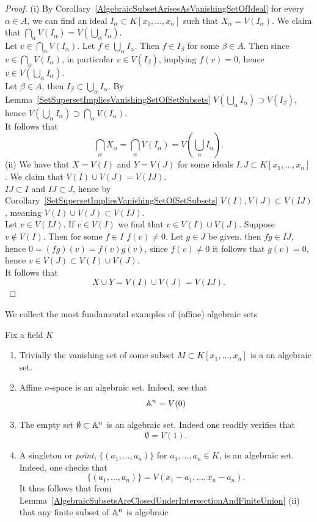 \begin{proof}
    (i) By Corollary~\ref{AlgebraicSubsetArisesAsVanishingSetOfIdeal} for every $\alpha\in A$, we can find an ideal $I_\alpha \subset K[x_1,\dots,x_n]$ such that $X_\alpha = V(I_\alpha)$. We claim that $\bigcap_\alpha V(I_\alpha) = V\left( \bigcup_\alpha I_\alpha\right)$.\\
    Let $v \in \bigcap_\alpha V(I_\alpha)$. Let $f\in \bigcup_\alpha I_\alpha$. Then $f\in I_\beta$ for some $\beta\in A$. Then since $v \in \bigcap_\alpha V(I_\alpha)$, in particular $v\in V(I_\beta)$, implying $f(v) = 0$, hence $v\in V\left( \bigcup_\alpha I_\alpha\right)$.\\
    Let $\beta\in A$, then $I_\beta \subset \bigcup_\alpha I_\alpha$. By Lemma~\ref{SetSupersetImpliesVanishingSetOfSetSubsets} $V\left(\bigcup_\alpha I_\alpha\right) \supset V(I_\beta)$, hence $V\left(\bigcup_\alpha I_\alpha\right) \supset \bigcap_\alpha V(I_\alpha)$.\\
    It follows that 
    $$\bigcap_\alpha X_\alpha =\bigcap_\alpha V(I_\alpha) = V\left(\bigcup_\alpha I_\alpha\right).$$
    (ii) We have that $X= V(I)$ and $Y = V(J)$ for some ideals $I,J\subset K[x_1,\dots,x_n]$. We claim that $V(I)\cup V(J) = V(IJ)$.\\ 
    $IJ\subset I$ and $IJ \subset J$, hence by Corollary~\ref{SetSupersetImpliesVanishingSetOfSetSubsets} $V(I),V(J)\subset V(IJ)$, meaning $V(I)\cup V(J) \subset V(IJ)$.\\
    Let $v\in V(IJ)$. If $v\in V(I)$ we find that $v\in V(I)\cup V(J)$. Suppose $v\notin V(I)$. Then for some $f\in I$ $f(v)\neq 0$. Let $g\in J$ be given. then $fg\in IJ$, hence $0 = (fg)(v) = f(v)g(v)$, since $f(v)\neq 0$ it follows that $g(v)= 0$, hence $v\in V(J)\subset V(I)\cup V(J)$.\\
    It follows that 
    $$X\cup Y = V(I)\cup V(J) = V(IJ).$$
\end{proof}
We collect the most fundamental examples of (affine) algebraic sets
\begin{example}\label{FundamentalExmaplesOfAffineAlgebraicSubsets}
Fix a field $K$
    \begin{enumerate}
        \item Trivially the vanishing set of some subset $M\subset K[x_1,\dots,x_n]$ is a an algebraic set. 
        \item Affine $n$-space is an algebraic set. Indeed, see that 
        $$\mathbb{A}^n = V(0)$$
        \item The empty set $\emptyset\subset \mathbb{A}^n$ is an algebraic set. Indeed one readily verifies that
        $$\emptyset = V(1).$$
        \item A singleton or \textit{point}, $\{(a_1,\dots,a_n)\}$ for $a_1,\dots,a_n\in K$, is an algebraic set. Indeed, one checks that
        $$\{(a_1,\dots,a_n)\} = V(x_1-a_1,\dots,x_n-a_n).$$
        It thus follows that from Lemma~\ref{AlgebraicSubsetsAreClosedUnderIntersectionAndFiniteUnion} (ii) that any finite subset of $\mathbb{A}^n$ is algebraic
    \end{enumerate}
\end{example}

